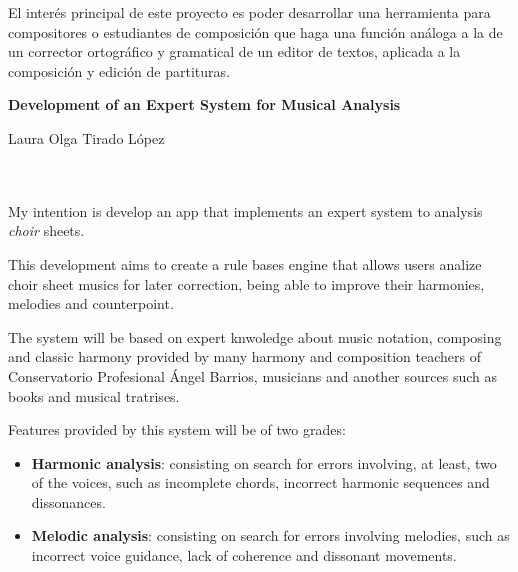 \bigskip

El interés principal de este proyecto es poder desarrollar una herramienta para compositores o estudiantes de composición que haga una función análoga a la de un corrector ortográfico y gramatical de un editor de textos, aplicada a la composición y edición de partituras.

\cleardoublepage


\thispagestyle{empty}


\begin{center}
{\large\bfseries Development of an Expert System for Musical Analysis}\\
\end{center}
\begin{center}
Laura Olga Tirado López\\
\end{center}

\\

\vspace{0.7cm}
\\

My intention is develop an app that implements an expert system to analysis \textit{choir} sheets.

\bigskip

This development aims to create a rule bases engine that allows users analize choir sheet musics for later correction, being able to improve their harmonies, melodies and counterpoint.

\bigskip

The system will be based on expert knwoledge about music notation, composing and classic harmony provided by many harmony and composition teachers of Conservatorio Profesional Ángel Barrios, musicians and another sources such as books and musical tratrises.

\bigskip

Features provided by this system will be of two grades:

\begin{itemize}
	\item \textbf{Harmonic analysis}: consisting on search for errors involving, at least, two of the voices, such as incomplete chords, incorrect harmonic sequences and  dissonances.
	\item  \textbf{Melodic analysis}: consisting on search for errors involving melodies, such as incorrect voice guidance, lack of coherence and dissonant movements. 
\end{itemize}

